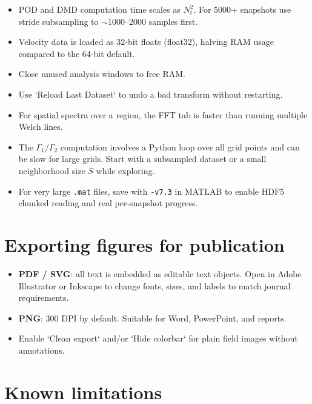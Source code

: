 \begin{itemize}[leftmargin=1.5em]
  \item POD and DMD computation time scales as $N_t^2$. For 5000+ snapshots use stride subsampling to $\sim$1000--2000 samples first.
  \item Velocity data is loaded as 32-bit floats (float32), halving RAM usage compared to the 64-bit default.
  \item Close unused analysis windows to free RAM.
  \item Use `Reload Last Dataset` to undo a bad transform without restarting.
  \item For spatial spectra over a region, the FFT tab is faster than running multiple Welch lines.
  \item The $\Gamma_1/\Gamma_2$ computation involves a Python loop over all grid points and can be slow for large grids. Start with a subsampled dataset or a small neighborhood size $S$ while exploring.
  \item For very large \texttt{.mat} files, save with \texttt{-v7.3} in MATLAB to enable HDF5 chunked reading and real per-snapshot progress.
\end{itemize}

\section{Exporting figures for publication}

\begin{itemize}[leftmargin=1.5em]
  \item \textbf{PDF / SVG}: all text is embedded as editable text objects. Open in Adobe Illustrator or Inkscape to change fonts, sizes, and labels to match journal requirements.
  \item \textbf{PNG}: 300 DPI by default. Suitable for Word, PowerPoint, and reports.
  \item Enable `Clean export` and/or `Hide colorbar` for plain field images without annotations.
\end{itemize}

\section{Known limitations}


